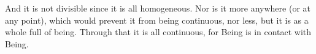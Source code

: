 \documentclass[preview]{standalone}
\begin{document}
\begin{center}
And it is not divisible since it is all homogeneous. Nor is it more anywhere (or at any point), which would prevent it from being continuous, nor less, but it is as a whole full of being. Through that it is all continuous, for Being is in contact with Being.
\end{center}
\end{document}
